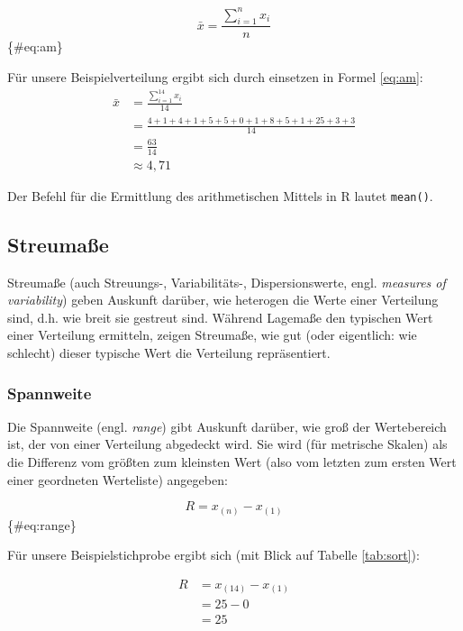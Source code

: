 \documentclass[
  ngerman,
]{article}
\begin{document}
\[
 \bar{x}=\frac{\sum\limits _{i=1}^{n}x_{i}}{n}
\]\{\#eq:am\}

Für unsere Beispielverteilung ergibt sich durch einsetzen in Formel \ref{eq:am}:
\[
  \begin{aligned}
     \bar{x}&=\frac{\sum\limits _{i=1}^{14}x_{i}}{14} \\[4pt]
            &=\frac{4+1+4+1+5+5+0+1+8+5+1+25+3+3}{14} \\[4pt]
            &=\frac{63}{14}\\[4pt]
            &\approx 4,71
  \end{aligned}
\]

\begin{rtip}
Der Befehl für die Ermittlung des arithmetischen Mittels in R lautet {\tt mean()}.
\end{rtip}

\hypertarget{streumauxdfe}{%
\subsection{Streumaße}\label{streumauxdfe}}

Streumaße (auch Streuungs-, Variabilitäts-, Dispersionswerte, engl. \emph{measures of variability}) geben Auskunft darüber, wie heterogen die Werte einer Verteilung sind, d.h. wie breit sie gestreut sind. Während Lagemaße den typischen Wert einer Verteilung ermitteln, zeigen Streumaße, wie gut (oder eigentlich: wie schlecht) dieser typische Wert die Verteilung repräsentiert.

\hypertarget{spannweite}{%
\subsubsection{Spannweite}\label{spannweite}}

Die Spannweite (engl. \emph{range}) gibt Auskunft darüber, wie groß der Wertebereich ist, der von einer Verteilung abgedeckt wird. Sie wird (für metrische Skalen) als die Differenz vom größten zum kleinsten Wert (also vom letzten zum ersten Wert einer geordneten Werteliste) angegeben:

\[
 R=x_{(n)} - x_{(1)}
\]\{\#eq:range\}

Für unsere Beispielstichprobe ergibt sich (mit Blick auf Tabelle \ref{tab:sort}):

\nopagebreak

\[
  \begin{aligned}
     R&=x_{(14)} - x_{(1)} \\[4pt]
     &=25-0 \\[4pt]
     &=25
  \end{aligned}
\]
\end{document}
